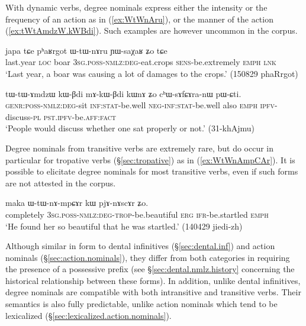 With dynamic verbs, degree nominals express either the intensity or the frequency of an action as in (\ref{ex:WtWnAru}), or the manner of the action (\ref{ex:tWtAmdzW.kWBdi}). Such examples are however uncommon in the corpus.

\begin{exe}
\ex \label{ex:WtWnAru}
\gll  japa tɕe pʰaʁrgot ɯ-tɯ-nɤru ɲɯ-saχaʁ ʑo tɕe \\
last.year \textsc{loc} boar  \textsc{3sg}.\textsc{poss}-\textsc{nmlz}:\textsc{deg}-eat.crops \textsc{sens}-be.extremely \textsc{emph} \textsc{lnk} \\
\glt `Last year, a boar was causing a lot of damages to the crops.' (150829 phaRrgot)
\end{exe}

\begin{exe}
\ex \label{ex:tWtAmdzW.kWBdi}
\gll tɯ-tɯ-ɤmdzɯ kɯ-βdi mɤ-kɯ-βdi kɯnɤ ʑo cʰɯ-sɤfɕɤra-nɯ pɯ-ɕti.  \\
\textsc{genr}:\textsc{poss}-\textsc{nmlz}:\textsc{deg}-sit \textsc{inf}:\textsc{stat}-be.well \textsc{neg}-\textsc{inf}:\textsc{stat}-be.well also \textsc{emph} \textsc{ipfv}-discuss-\textsc{pl} \textsc{pst}.\textsc{ipfv}-be.\textsc{aff}:\textsc{fact} \\
\glt `People would discuss whether one sat properly or not.' (31-khAjmu) 	
\end{exe}

Degree nominals from transitive verbs are extremely rare, but do occur in particular for tropative verbs (§\ref{sec:tropative}) as in (\ref{ex:WtWnAmpCAr}). It is possible to elicitate degree nominals for most transitive verbs, even if such forms are not attested in the corpus.
 
\begin{exe}
\ex \label{ex:WtWnAmpCAr}
\gll  maka ɯ-tɯ-nɤ-mpɕɤr kɯ pjɤ-nɤscɤr ʑo. \\
completely  \textsc{3sg}.\textsc{poss}-\textsc{nmlz}:\textsc{deg}-\textsc{trop}-be.beautiful \textsc{erg} \textsc{ifr}-be.startled \textsc{emph} \\
\glt `He found her so beautiful that he was startled.' (140429 jiedi-zh)
\end{exe} 
 
Although similar in form to dental infinitives (§\ref{sec:dental.inf}) and action nominals (§\ref{sec:action.nominals}), they differ from both categories in requiring the presence of a possessive prefix (see §\ref{sec:dental.nmlz.history} concerning the historical relationship between these forms). In addition, unlike dental infinitives, degree nominals are compatible with both intransitive and transitive verbs. Their semantics is also fully predictable, unlike action nominals which tend to be lexicalized (§\ref{sec:lexicalized.action.nominals}).

